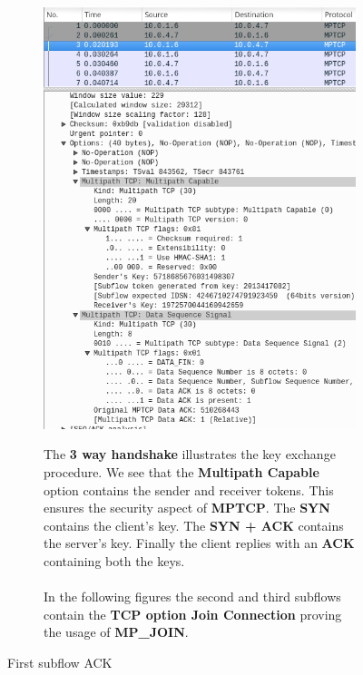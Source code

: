 \documentclass[a4paper,11pt]{article}
\begin{document}
			\begin{figure}[h!]
			\centering
			\label{fig:firstflowack}
			\begin{subfigure}{.5\textwidth}
			  \centering
			  \label{fig:firstflow}
			  \includegraphics[width=0.8\linewidth]{pictures/firstflowack.jpg}
			\end{subfigure}%
			\begin{subfigure}{.5\textwidth}
			  The \textbf{3 way handshake} illustrates the key exchange procedure. We see that the \textbf{Multipath Capable} option contains the sender and receiver tokens. This ensures the security aspect of \textbf{MPTCP}. The \textbf{SYN} contains the client's key. The \textbf{SYN + ACK} contains the server's key. Finally the client replies with an \textbf{ACK} containing both the keys. \\
			  \\
			  In the following figures the second and third subflows contain the \textbf{TCP option Join Connection} proving the usage of \textbf{MP\_JOIN}.
			\end{subfigure}
			\caption{First subflow ACK}
			\end{figure}

			
\end{document}
